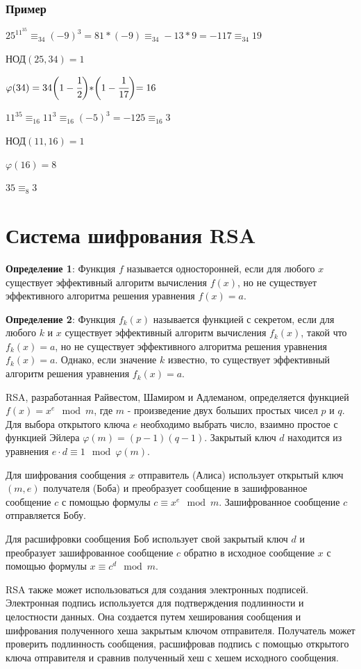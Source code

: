 \documentclass[12pt]{article}
\begin{document}
\subsubsection{Пример}
$25^{11^{35}}\equiv_{34}(-9)^{3}=81*(-9)\equiv_{34}-13*9=-117\equiv_{34}19$
\par НОД$(25,34)=1$
\par $\varphi(34)=34\biggl(1-\cfrac{1}{2}\biggl)*\biggl(1-\cfrac{1}{17}\biggl)=16$
\par $11^{35}\equiv_{16}11^{3}\equiv_{16}(-5)^{3}=-125\equiv_{16}3$
\par НОД$(11,16)=1$
\par $\varphi(16)=8$
\par $35\equiv_{8}3$

\section{Система шифрования RSA}

\textbf{Определение 1}: Функция $f$ называется односторонней, если для любого $x$ существует эффективный алгоритм вычисления $f(x)$, но не существует эффективного алгоритма решения уравнения $f(x) = a$.

\textbf{Определение 2}: Функция $f_k(x)$ называется функцией с секретом, если для любого $k$ и $x$ существует эффективный алгоритм вычисления $f_k(x)$, такой что $f_k(x) = a$, но не существует эффективного алгоритма решения уравнения $f_k(x) = a$. Однако, если значение $k$ известно, то существует эффективный алгоритм решения уравнения $f_k(x) = a$.

RSA, разработанная Райвестом, Шамиром и Адлеманом, определяется функцией $f(x) = x^e \mod m$, где $m$ - произведение двух больших простых чисел $p$ и $q$. Для выбора открытого ключа $e$ необходимо выбрать число, взаимно простое с функцией Эйлера $\varphi(m) = (p-1)(q-1)$. Закрытый ключ $d$ находится из уравнения $e \cdot d \equiv 1 \mod \varphi(m)$.

Для шифрования сообщения $x$ отправитель (Алиса) использует открытый ключ $(m,e)$ получателя (Боба) и преобразует сообщение в зашифрованное сообщение $c$ с помощью формулы $c \equiv x^e \mod m$. Зашифрованное сообщение $c$ отправляется Бобу.

Для расшифровки сообщения Боб использует свой закрытый ключ $d$ и преобразует зашифрованное сообщение $c$ обратно в исходное сообщение $x$ с помощью формулы $x \equiv c^d \mod m$.

RSA также может использоваться для создания электронных подписей. Электронная подпись используется для подтверждения подлинности и целостности данных. Она создается путем хеширования сообщения и шифрования полученного хеша закрытым ключом отправителя. Получатель может проверить подлинность сообщения, расшифровав подпись с помощью открытого ключа отправителя и сравнив полученный хеш с хешем исходного сообщения.
\end{document}
